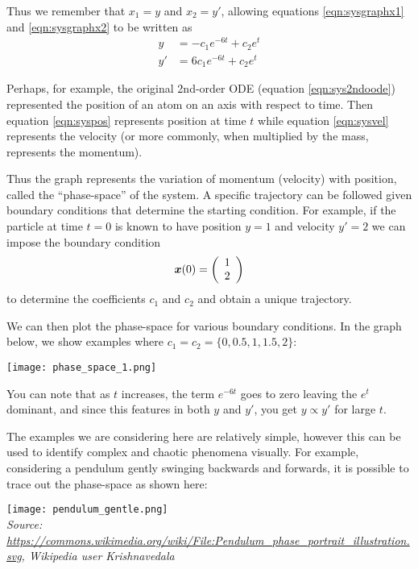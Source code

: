Thus we remember that $x_1 = y$ and $x_2 = y'$, allowing equations \ref{eqn:sysgraphx1} and \ref{eqn:sysgraphx2} to be written as
\begin{align}
    y &= -c_1 e^{-6t} + c_2 e^t \label{eqn:syspos} \\
    y' &= 6 c_1 e^{-6t} + c_2 e^t \label{eqn:sysvel} 
\end{align}

Perhaps, for example, the original 2nd-order ODE (equation \ref{eqn:sys2ndoode}) represented the position of an atom on an axis with respect to time. Then equation \ref{eqn:syspos} represents position at time $t$ while equation \ref{eqn:sysvel} represents the velocity (or more commonly, when multiplied by the mass, represents the momentum).

Thus the graph represents the variation of momentum (velocity) with position, called the ``phase-space'' of the system. A specific trajectory can be followed given boundary conditions that determine the starting condition. For example, if the particle at time $t=0$ is known to have position $y=1$ and velocity $y'=2$ we can impose the boundary condition
\begin{equation}
    \bm{x}(0) = \left(\begin{array}{c}{1}\\{2}\end{array}\right)
\end{equation}
to determine the coefficients $c_1$ and $c_2$ and obtain a unique trajectory.

We can then plot the phase-space for various boundary conditions. In the graph below, we show examples where $c_1 = c_2 = \{0, 0.5, 1, 1.5, 2\}$:

\texttt{[image: phase\_space\_1.png]}

You can note that as $t$ increases, the term $e^{-6t}$ goes to zero leaving the $e^t$ dominant, and since this features in both $y$ and $y'$, you get $y \propto y'$ for large $t$. %

The examples we are considering here are relatively simple, however this can be used to identify complex and chaotic phenomena visually. For example, considering a pendulum gently swinging backwards and forwards, it is possible to trace out the phase-space as shown here:

\texttt{[image: pendulum\_gentle.png]}\\
\emph{\small{Source: \url{https://commons.wikimedia.org/wiki/File:Pendulum_phase_portrait_illustration.svg}, Wikipedia user Krishnavedala}}

